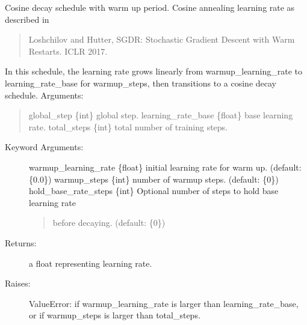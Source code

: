 \documentclass[letterpaper,10pt,english]{sphinxmanual}
\begin{document}
\begin{fulllineitems}
\begin{fulllineitems}
\end{fulllineitems}


\begin{fulllineitems}
\label{\detokenize{engine/schedulers/cosine_decay:engine.schedulers.cosine_decay.WarmUpCosineDecayScheduler.cosine_decay_with_warmup}}
Cosine decay schedule with warm up period.
Cosine annealing learning rate as described in
\begin{quote}

Loshchilov and Hutter, SGDR: Stochastic Gradient Descent with Warm Restarts.
ICLR 2017. 
\end{quote}

In this schedule, the learning rate grows linearly from warmup\_learning\_rate
to learning\_rate\_base for warmup\_steps, then transitions to a cosine decay
schedule.
Arguments:
\begin{quote}

global\_step \{int\} \textendash{} global step.
learning\_rate\_base \{float\} \textendash{} base learning rate.
total\_steps \{int\} \textendash{} total number of training steps.
\end{quote}
\begin{description}
\item[{Keyword Arguments:}] \leavevmode
warmup\_learning\_rate \{float\} \textendash{} initial learning rate for warm up. (default: \{0.0\})
warmup\_steps \{int\} \textendash{} number of warmup steps. (default: \{0\})
hold\_base\_rate\_steps \{int\} \textendash{} Optional number of steps to hold base learning rate
\begin{quote}

before decaying. (default: \{0\})
\end{quote}

\item[{Returns:}] \leavevmode
a float representing learning rate.

\item[{Raises:}] \leavevmode
ValueError: if warmup\_learning\_rate is larger than learning\_rate\_base,
or if warmup\_steps is larger than total\_steps.

\end{description}

\end{fulllineitems}


\end{fulllineitems}
\end{document}
